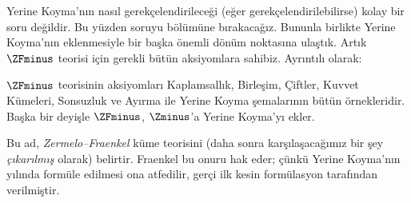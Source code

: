 \documentclass[../../../include/open-logic-section]{subfiles}
\begin{document}

Yerine Koyma'nın nasıl gerekçelendirileceği (eğer gerekçelendirilebilirse)
kolay bir soru değildir. Bu yüzden soruyu 
bölümüne bırakacağız. Bununla birlikte Yerine Koyma'nın eklenmesiyle bir
başka önemli dönüm noktasına ulaştık. Artık $\ZFminus$ teorisi için gerekli
bütün aksiyomlara sahibiz. Ayrıntılı olarak:

\begin{defn}
$\ZFminus$ teorisinin aksiyomları Kaplamsallık, Birleşim, Çiftler, Kuvvet
Kümeleri, Sonsuzluk ve Ayırma ile Yerine Koyma şemalarının bütün
örnekleridir. Başka bir deyişle $\ZFminus$, $\Zminus$'a Yerine Koyma'yı
ekler.
\end{defn}
\noindent
Bu ad, \emph{Zermelo--Fraenkel} küme teorisini (daha sonra karşılaşacağımız
bir şey \emph{çıkarılmış} olarak) belirtir. Fraenkel bu onuru hak eder;
çünkü Yerine Koyma'nın \citeyear{Fraenkel1922} yılında formüle edilmesi ona
atfedilir, gerçi ilk kesin formülasyon \citet{Skolem1922} tarafından
verilmiştir.
\end{document}
